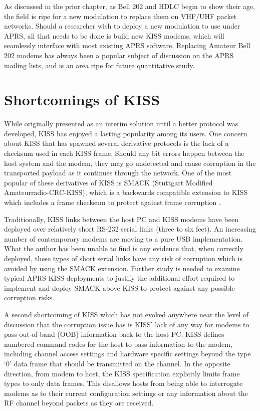 As discussed in the prior chapter,
as Bell 202 and HDLC begin to show their age, the field is ripe for a new
modulation to replace them on VHF/UHF packet networks.
Should a researcher wish to deploy a new modulation to use under APRS,
all that needs to be done is build new KISS modems, which will seamlessly
interface with most existing APRS software.
Replacing Amateur Bell 202 modems has always been a popular subject of
discussion on the APRS mailing lists, and is an area ripe for future
quantitative study.

\section{Shortcomings of KISS}

While originally presented as an interim solution until a better protocol was
developed, KISS has enjoyed a lasting popularity among its users.
One concern about KISS that has spawned several derivative protocols is the
lack of a checksum used in each KISS frame.
Should any bit errors happen between the host system and the modem,
they may go undetected and cause corruption in the transported payload
as it continues through the network.
One of the most popular of these derivatives of KISS is SMACK (Stuttgart Modified
Amateurradio-CRC-KISS), which is a backwards compatible extension to KISS
which includes a frame checksum to protect against frame corruption \cite{smack}.

Traditionally, KISS links between the host PC and KISS modems have been deployed
over relatively short RS-232 serial links (three to six feet).
An increasing number of contemporary modems are moving to a pure USB implementation.
What the author has been unable to find is any evidence that, when correctly
deployed, these types of short serial links have any risk of corruption
which is avoided by using the SMACK extension.
Further study is needed to examine typical APRS KISS deployments to justify
the additional effort required to implement and deploy SMACK above KISS to
protect against any possible corruption risks.

A second shortcoming of KISS which has not evoked anywhere near the
level of discussion that the corruption issue has is KISS' lack of any way
for modems to pass out-of-band (OOB) information back to the host PC.
KISS defines numbered command codes for the host to pass information to the
modem, including channel access settings and hardware specific settings
beyond the type `0' data frame that should be transmitted on the channel.
In the opposite direction, from modem to host, the KISS specification explicitly
limits frame types to only data frames.
This disallows hosts from being able to interrogate modems as to their
current configuration settings or any information about the RF channel
beyond packets as they are received.

